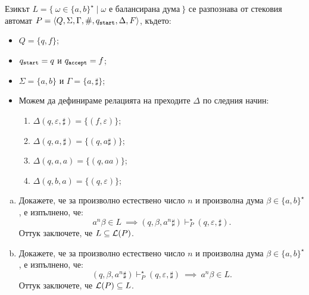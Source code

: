 \begin{extra}
\begin{example}
  Езикът $L = \{\ \omega \in \{a,b\}^\star \mid \omega\text{ е балансирана дума}\ \}$
  се разпознава от стековия автомат $P = \langle{Q,\Sigma,\Gamma,\#,q_{\texttt{start}},\Delta,F}\rangle$, където:
  \begin{itemize}
  \item 
    $Q = \{q,f\}$;
  \item
    $q_{\texttt{start}} = q$ и $q_{\texttt{accept}} = f$;
  \item
    $\Sigma = \{a,b\}$ и $\Gamma = \{a, \sharp\}$;
  \item
    Можем да дефинираме релацията на преходите $\Delta$ по следния начин:
    \begin{enumerate}[(1)]
    \item 
      $\Delta(q, \varepsilon, \sharp) = \{(f, \varepsilon)\}$;
    \item
      $\Delta(q, a, \sharp) = \{(q, a\sharp)\}$;
    \item
      $\Delta(q, a, a) = \{(q, aa)\}$;
    \item
      $\Delta(q, b, a) = \{(q, \varepsilon)\}$;
    \end{enumerate}
  \end{itemize}  
  \begin{enumerate}[(a)]
  \item
    Докажете, че за произволно естествено число $n$ и произволна дума $\beta \in \{a, b\}^\star$, 
    е изпълнено, че:
    \[a^n\beta \in L\ \implies (q, \beta, a^n\sharp) \vdash^\star_P (q, \varepsilon, \sharp).\]
    Оттук заключете, че $L \subseteq \mathcal{L}(P)$.
  \item
    Докажете, че за произволно естествено число $n$ и произволна дума $\beta \in \{a, b\}^\star$, е изпълнено, че:
    \[(q,\beta,a^n\sharp) \vdash^\star_P (q, \varepsilon, \sharp)\ \implies\ a^n\beta \in L.\]
    Оттук заключете, че $\mathcal{L}(P) \subseteq L$.
  \end{enumerate}
\end{example}
\end{extra}


